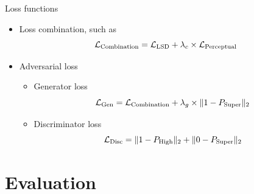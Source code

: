\documentclass{beamer}
\newcounter{section}
\begin{document}
\begin{frame}[t]{Loss functions}

    \begin{itemize}
        \item Loss combination, such as
            \begin{equation}
                \centering
                \mathcal{L}_{\text{Combination}} = \mathcal{L}_{\text{LSD}} + \lambda_c \times \mathcal{L}_{\text{Perceptual}}
                \label{loss combination equation}
            \end{equation}

        \vspace{0.5\baselineskip}
        
        \item Adversarial loss
        \vspace{0.5\baselineskip}

        \begin{itemize}
            \item Generator loss
            \vspace{0.3\baselineskip}
                \begin{equation}
                    \centering
                    \mathcal{L}_{\text{Gen}} = \mathcal{L}_{\text{Combination}} + \lambda_g \times \| 1 - P_{\text{Super}} \|_{2}
                \end{equation}
                
            \vspace{0.3\baselineskip}
            
            \item Discriminator loss
            \vspace{0.3\baselineskip}
                \begin{equation}
                    \centering
                    \mathcal{L}_{\text{Disc}} = \| 1 - P_{\text{High}} \|_{2} + \| 0 - P_{\text{Super}} \|_{2}
                \end{equation}
            
        \end{itemize}
            
    \end{itemize}
    
\end{frame}


\section{Evaluation}
\setcounter{section}{4}
\setcounter{figure}{0}
\setcounter{table}{0}
\end{document}
